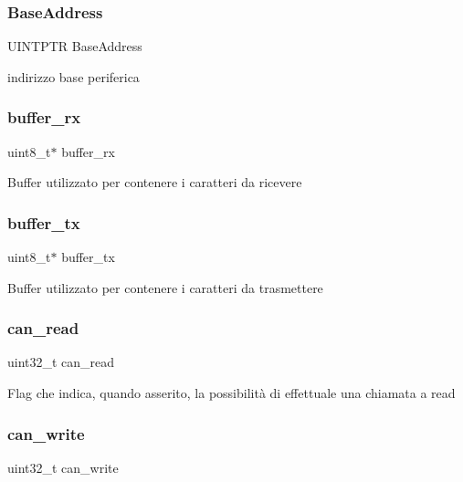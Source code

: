 \subsubsection{\texorpdfstring{Base\+Address}{BaseAddress}}
{\footnotesize\ttfamily U\+I\+N\+T\+P\+TR Base\+Address}

indirizzo base periferica \mbox{\label{structUART_a8d74db61fcf94cb509a2b1392fa17e41}} 
\subsubsection{\texorpdfstring{buffer\+\_\+rx}{buffer\_rx}}
{\footnotesize\ttfamily uint8\+\_\+t$\ast$ buffer\+\_\+rx}

Buffer utilizzato per contenere i caratteri da ricevere \mbox{\label{structUART_ac53416e03cc33e6c3b144cbf8d157510}} 
\subsubsection{\texorpdfstring{buffer\+\_\+tx}{buffer\_tx}}
{\footnotesize\ttfamily uint8\+\_\+t$\ast$ buffer\+\_\+tx}

Buffer utilizzato per contenere i caratteri da trasmettere \mbox{\label{structUART_a2b8d3d6037e2d2fdadbd7c2fd995f0a1}} 
\subsubsection{\texorpdfstring{can\+\_\+read}{can\_read}}
{\footnotesize\ttfamily uint32\+\_\+t can\+\_\+read}

Flag che indica, quando asserito, la possibilità di effettuale una chiamata a read \mbox{\label{structUART_a5f5f15dfb65ef3e8f9f6142a8e726494}} 
\subsubsection{\texorpdfstring{can\+\_\+write}{can\_write}}
{\footnotesize\ttfamily uint32\+\_\+t can\+\_\+write}


